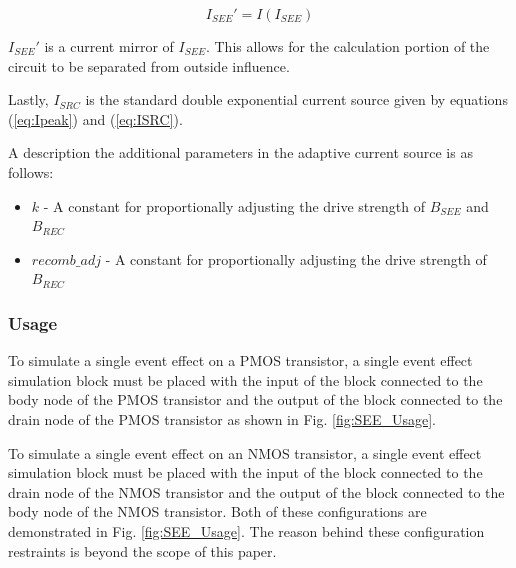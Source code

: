 \documentclass[conference]{IEEEtran}
\begin{document}
    \begin{equation}
        I_{SEE}' = I(I_{SEE})\label{eq:ISEE'}
    \end{equation}

    \(I_{SEE}'\) is a current mirror of \(I_{SEE}\).
    This allows for the calculation portion of the circuit to be separated from outside influence.

    Lastly, \(I_{SRC}\) is the standard double exponential current source given by equations (\ref{eq:Ipeak}) and (\ref{eq:ISRC}).

    A description the additional parameters in the adaptive current source is as follows:

    \begin{itemize}
        \item[] \(k\) - A constant for proportionally adjusting the drive strength of \(B_{SEE}\) and \(B_{REC}\)

        \item[] \(recomb\_adj\) - A constant for proportionally adjusting the drive strength of \(B_{REC}\)

    \end{itemize}
    \vspace{1em}

    \subsubsection{Usage}
    To simulate a single event effect on a PMOS transistor, a single event effect simulation block must be placed with the input of the block connected to the body node of the PMOS transistor and the output of the block connected to the drain node of the PMOS transistor as shown in Fig. \ref{fig:SEE_Usage}.

    To simulate a single event effect on an NMOS transistor, a single event effect simulation block must be placed with the input of the block connected to the drain node of the NMOS transistor and the output of the block connected to the body node of the NMOS transistor.
    Both of these configurations are demonstrated in Fig. \ref{fig:SEE_Usage}.
    The reason behind these configuration restraints is beyond the scope of this paper.

\end{document}
